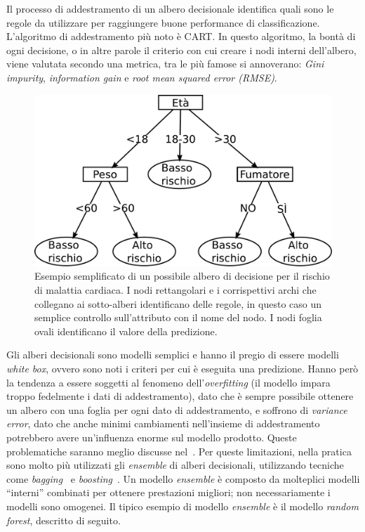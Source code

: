 Il processo di addestramento di un albero decisionale identifica quali sono le regole da utilizzare per raggiungere buone performance di classificazione. 
L'algoritmo di addestramento più noto è CART. 
In questo algoritmo, la bontà di ogni decisione, o in altre parole il criterio con cui creare i nodi interni dell'albero, viene valutata secondo una metrica, tra le più famose si annoverano: \emph{Gini impurity}, \emph{information gain} e \emph{root mean squared error (RMSE)}. 
\begin{figure}
    \centering
    \includegraphics[width=0.7\linewidth]{img/decision_tree.pdf}
    \caption[Esempio albero di decisione.]{Esempio semplificato di un possibile albero di decisione per il rischio di malattia cardiaca. I nodi rettangolari e i corrispettivi archi che collegano ai sotto-alberi identificano delle regole, in questo caso un semplice controllo sull'attributo con il nome del nodo. I nodi foglia ovali identificano il valore della predizione.}
    \label{fig:decision_tree}
\end{figure}
Gli alberi decisionali sono modelli semplici e hanno il pregio di essere modelli \emph{white box}, ovvero sono noti i criteri per cui è eseguita una predizione.
Hanno però la tendenza a essere soggetti al fenomeno dell'\emph{overfitting} (il modello impara troppo fedelmente i dati di addestramento), dato che è sempre possibile ottenere un albero con una foglia per ogni dato di addestramento, e soffrono di \emph{variance error}, dato che anche minimi cambiamenti nell'insieme di addestramento potrebbero avere un'influenza enorme sul modello prodotto.
Queste problematiche saranno meglio discusse nel~.
Per queste limitazioni, nella pratica sono molto più utilizzati gli \emph{ensemble} di alberi decisionali, utilizzando tecniche come \emph{bagging}~\cite{bagging_predictors} e \emph{boosting}~\cite{adaboost}.
Un modello \emph{ensemble} è composto da molteplici modelli ``interni'' combinati per ottenere prestazioni migliori; non necessariamente i modelli sono omogenei.
Il tipico esempio di modello \emph{ensemble} è il modello \emph{random forest}, descritto di seguito.

